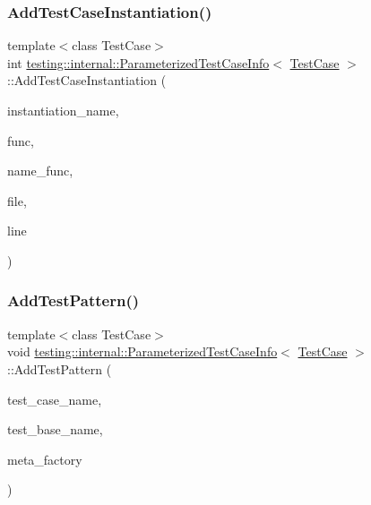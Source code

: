\subsubsection{\texorpdfstring{AddTestCaseInstantiation()}{AddTestCaseInstantiation()}}
{\footnotesize\ttfamily template$<$class Test\+Case$>$ \\
int \mbox{\hyperlink{classtesting_1_1internal_1_1ParameterizedTestCaseInfo}{testing\+::internal\+::\+Parameterized\+Test\+Case\+Info}}$<$ \mbox{\hyperlink{classtesting_1_1TestCase}{Test\+Case}} $>$\+::Add\+Test\+Case\+Instantiation (\begin{DoxyParamCaption}\item[{const std\+::string \&}]{instantiation\+\_\+name,  }\item[{Generator\+Creation\+Func $\ast$}]{func,  }\item[{\mbox{\hyperlink{classtesting_1_1internal_1_1ParameterizedTestCaseInfo_aed6c5184cb8f94cec73e9d7c4b7fa2ce}{Param\+Name\+Generator\+Func}} $\ast$}]{name\+\_\+func,  }\item[{const char $\ast$}]{file,  }\item[{int}]{line }\end{DoxyParamCaption})\hspace{0.3cm}{\ttfamily [inline]}}

\mbox{\label{classtesting_1_1internal_1_1ParameterizedTestCaseInfo_a3e557c888ec5e23b138c2ff254db15e5}} 
\subsubsection{\texorpdfstring{AddTestPattern()}{AddTestPattern()}}
{\footnotesize\ttfamily template$<$class Test\+Case$>$ \\
void \mbox{\hyperlink{classtesting_1_1internal_1_1ParameterizedTestCaseInfo}{testing\+::internal\+::\+Parameterized\+Test\+Case\+Info}}$<$ \mbox{\hyperlink{classtesting_1_1TestCase}{Test\+Case}} $>$\+::Add\+Test\+Pattern (\begin{DoxyParamCaption}\item[{const char $\ast$}]{test\+\_\+case\+\_\+name,  }\item[{const char $\ast$}]{test\+\_\+base\+\_\+name,  }\item[{\mbox{\hyperlink{classtesting_1_1internal_1_1TestMetaFactoryBase}{Test\+Meta\+Factory\+Base}}$<$ \mbox{\hyperlink{classtesting_1_1internal_1_1ParameterizedTestCaseInfo_a643a87e178bf92a4246ce21054e44b96}{Param\+Type}} $>$ $\ast$}]{meta\+\_\+factory }\end{DoxyParamCaption})\hspace{0.3cm}{\ttfamily [inline]}}

